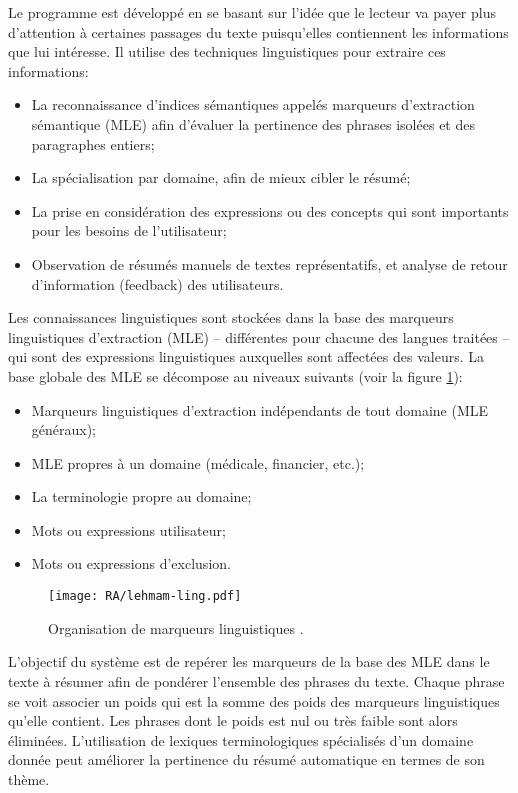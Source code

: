 \documentclass[a4paper,12pt,oneside]{../use/ESIthesis}
\begin{document}
Le programme est développé en se basant sur l'idée que le lecteur va payer plus d'attention à certaines passages du texte puisqu'elles contiennent les informations que lui intéresse. 
Il utilise des techniques linguistiques pour extraire ces informations: 
\begin{itemize}
\item La reconnaissance d'indices sémantiques appelés marqueurs d'extraction sémantique (MLE) afin d'évaluer la pertinence des phrases isolées et des paragraphes entiers;
\item La spécialisation par domaine, afin de mieux cibler le résumé;
\item La prise en considération des expressions ou des concepts qui sont importants pour les besoins de l'utilisateur;
\item Observation de résumés manuels de textes représentatifs, et analyse de retour d'information (feedback) des utilisateurs.
\end{itemize}
Les  connaissances linguistiques sont stockées dans la base des marqueurs linguistiques d'extraction (MLE) – différentes pour chacune des langues traitées – qui sont des expressions linguistiques auxquelles sont affectées des valeurs. 
La base globale des MLE se décompose au niveaux suivants (voir la figure \ref{fig:lehmam-ling}):
\begin{itemize}
\item Marqueurs linguistiques d'extraction indépendants de tout domaine (MLE généraux);
\item MLE propres à un domaine (médicale, financier, etc.);
\item La terminologie propre au domaine;
\item Mots ou expressions utilisateur;
\item Mots ou expressions d'exclusion.
\end{itemize}

\begin{figure}[ht]
\begin{center}
\texttt{[image: RA/lehmam-ling.pdf]} %
 \caption[Organisation de marqueurs linguistiques]{Organisation de marqueurs linguistiques \cite{10-lehmam}.}
 \label{fig:lehmam-ling}
\end{center}
\end{figure}

L'objectif du système est de repérer les marqueurs de la base des MLE dans le texte à résumer afin de pondérer l'ensemble des phrases du texte. 
Chaque phrase se voit associer un poids qui est la somme des poids des marqueurs linguistiques qu'elle contient. 
Les phrases dont le poids est nul ou très faible sont alors éliminées. 
L'utilisation de lexiques terminologiques spécialisés d'un domaine donnée peut améliorer la pertinence du résumé automatique en termes de son thème. 
\end{document}
